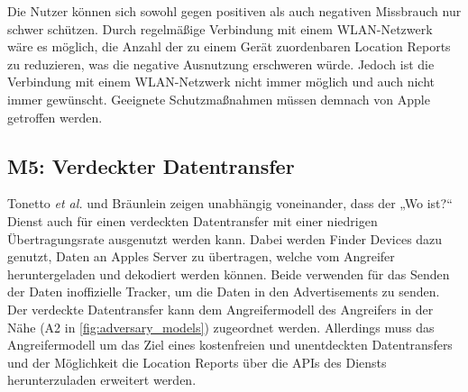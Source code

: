 Die Nutzer können sich sowohl gegen positiven als auch negativen Missbrauch nur schwer schützen.
Durch regelmäßige Verbindung mit einem WLAN-Netzwerk wäre es möglich, die Anzahl der zu einem Gerät zuordenbaren Location Reports zu reduzieren, was die negative Ausnutzung erschweren würde.
Jedoch ist die Verbindung mit einem WLAN-Netzwerk nicht immer möglich und auch nicht immer gewünscht.
Geeignete Schutzmaßnahmen müssen demnach von Apple getroffen werden.


\subsection[M5]{M5: Verdeckter Datentransfer}
\label{missbrauch:5}
Tonetto \textit{et al.} \cite{Tonetto_FindMy} und Bräunlein \cite{braeunlein_sendmy} zeigen unabhängig voneinander, dass der „Wo ist?“ Dienst auch für einen verdeckten Datentransfer mit einer niedrigen Übertragungsrate ausgenutzt werden kann.
Dabei werden Finder Devices dazu genutzt, Daten an Apples Server zu übertragen, welche vom Angreifer heruntergeladen und dekodiert werden können.
Beide verwenden für das Senden der Daten inoffizielle Tracker, um die Daten in den Advertisements zu senden.
Der verdeckte Datentransfer kann dem Angreifermodell des Angreifers in der Nähe (A2 in \autoref{fig:adversary_models}) zugeordnet werden.
Allerdings muss das Angreifermodell um das Ziel eines kostenfreien und unentdeckten Datentransfers und der Möglichkeit die Location Reports über die \acp{API} des Diensts herunterzuladen erweitert werden.


